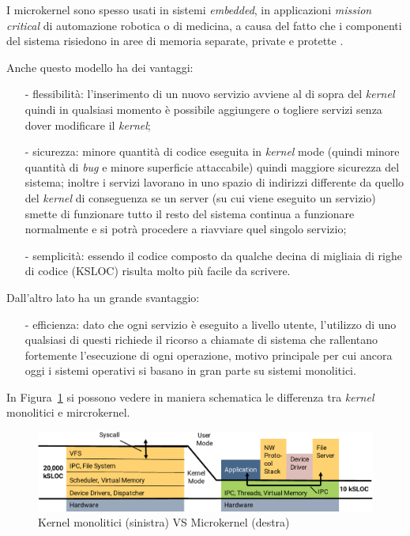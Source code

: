I microkernel sono spesso usati in sistemi \textit{embedded}, in applicazioni \textit{mission critical} di automazione robotica o di medicina, a causa del fatto che i componenti del sistema risiedono in aree di memoria separate, private e protette \cite{kernelWikipedia}.

Anche questo modello ha dei vantaggi:
\begin{itemize}
	\item[-] flessibilità: l'inserimento di un nuovo servizio avviene al di sopra del \textit{kernel} quindi in qualsiasi momento è possibile aggiungere o togliere servizi senza dover modificare il \textit{kernel};
	\item[-] sicurezza: minore quantità di codice eseguita in \textit{kernel} mode (quindi minore quantità di \textit{bug} e minore superficie attaccabile) quindi maggiore sicurezza del sistema; inoltre i servizi lavorano in uno spazio di indirizzi differente da quello del \textit{kernel} di conseguenza se un server (su cui viene eseguito un servizio) smette di funzionare tutto il resto del sistema continua a funzionare normalmente e si potrà procedere a riavviare quel singolo servizio;
	\item[-] semplicità: essendo il codice composto da qualche decina di migliaia di righe di codice (KSLOC) risulta molto più facile da scrivere.
\end{itemize}
Dall'altro lato ha un grande svantaggio:
\begin{itemize}
	\item[-] efficienza: dato che ogni servizio è eseguito a livello utente, l'utilizzo di uno qualsiasi di questi richiede il ricorso a chiamate di sistema che rallentano fortemente l'esecuzione di ogni operazione, motivo principale per cui ancora oggi i sistemi operativi si basano in gran parte su sistemi monolitici.
\end{itemize}
In Figura~\ref{fig:MonolithicVSmicrokernel} si possono vedere in maniera schematica le differenza tra \textit{kernel} monolitici e mircrokernel.

\begin{figure}[h]
  \includegraphics[width=\linewidth]{img/MonolithicVSmicrokernel.png}
  \caption{Kernel monolitici (sinistra) VS Microkernel (destra)}
  \label{fig:MonolithicVSmicrokernel}
\end{figure}
\newpage


